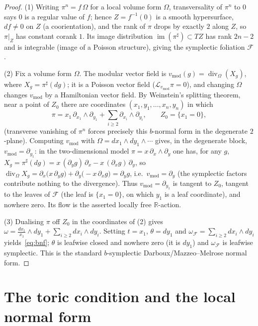 \documentclass{amsart}
\theoremstyle{definition}
\begin{document}
\begin{proof}
(1) Writing $\pi^n=f\,\Omega$ for a local volume form $\Omega$, transversality
of $\pi^n$ to $0$ says $0$ is a regular value of $f$; hence $Z=f^{-1}(0)$ is a
smooth hypersurface, $df\neq0$ on $Z$ (a coorientation), and the rank of $\pi$
drops by exactly $2$ along $Z$, so $\pi|_Z$ has constant corank $1$. Its image
distribution $\operatorname{im}(\pi^\sharp)\subset TZ$ has rank $2n-2$ and is
integrable (image of a Poisson structure), giving the symplectic foliation
$\mathcal F$.

(2) Fix a volume form $\Omega$. The modular vector field is
$v_{\mathrm{mod}}(g)=\operatorname{div}_\Omega(X_g)$, where
$X_g=\pi^\sharp(dg)$; it is a Poisson vector field
($\mathcal L_{v_{\mathrm{mod}}}\pi=0$), and changing $\Omega$ changes
$v_{\mathrm{mod}}$ by a Hamiltonian vector field. By Weinstein's splitting
theorem, near a point of $Z_0$ there are coordinates $(x_1,y_1,\dots,x_n,y_n)$
in which
\[
\pi=x_1\,\partial_{x_1}\wedge\partial_{y_1}
+\sum_{i\ge2}\partial_{x_i}\wedge\partial_{y_i},\qquad Z_0=\{x_1=0\},
\]
(transverse vanishing of $\pi^n$ forces precisely this $b$-normal form in the
degenerate $2$-plane). Computing $v_{\mathrm{mod}}$ with
$\Omega=dx_1\wedge dy_1\wedge\cdots$ gives, in the degenerate block,
$v_{\mathrm{mod}}=\partial_{y_1}$: in the two-dimensional model
$\pi=x\,\partial_x\wedge\partial_y$ one has, for any $g$,
$X_g=\pi^\sharp(dg)=x\,(\partial_y g)\,\partial_x-x\,(\partial_x g)\,\partial_y$,
so $\operatorname{div}_\Omega X_g=\partial_x\!\bigl(x\,\partial_y g\bigr)
+\partial_y\!\bigl(-x\,\partial_x g\bigr)=\partial_y g$, i.e.\
$v_{\mathrm{mod}}=\partial_y$ (the symplectic factors contribute nothing to the
divergence). Thus $v_{\mathrm{mod}}=\partial_{y_1}$ is tangent to $Z_0$,
tangent to the leaves of $\mathcal F$ (the leaf is $\{x_1=0\}$, on which
$y_1$ is a leaf coordinate), and nowhere zero. Its flow is the asserted locally
free $\mathbb R$-action.

(3) Dualising $\pi$ off $Z_0$ in the coordinates of (2) gives
$\omega=\tfrac{dx_1}{x_1}\wedge dy_1+\sum_{i\ge2}dx_i\wedge dy_i$. Setting
$t=x_1$, $\theta=dy_1$ and $\omega_{\mathcal F}=\sum_{i\ge2}dx_i\wedge dy_i$
yields~\eqref{eq:bnf}; $\theta$ is leafwise closed and nowhere zero (it is
$dy_1$) and $\omega_{\mathcal F}$ is leafwise symplectic. This is the standard
$b$-symplectic Darboux/Mazzeo--Melrose normal form.
\end{proof}

\section{The toric condition and the local normal form}
\end{document}
